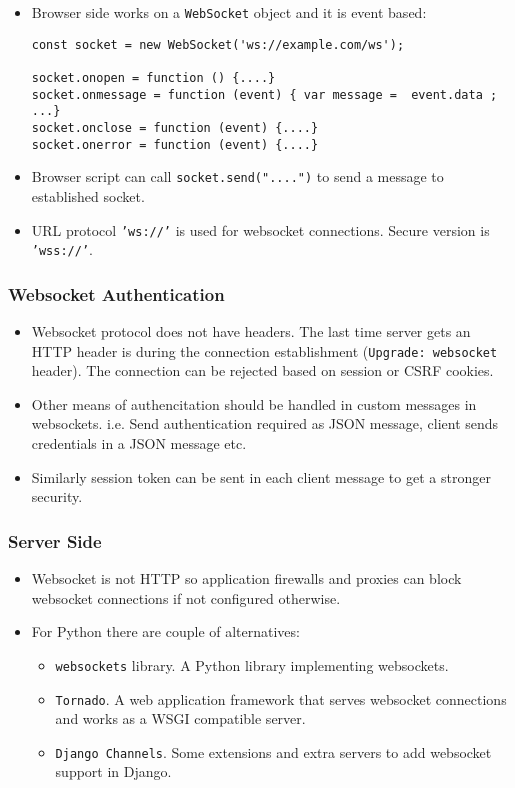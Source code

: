 \documentclass[trans,compress,xcolor=table]{beamer}
\begin{document}
\begin{frame}[fragile]
\begin{itemize}
\item Browser side works on a \lstinline!WebSocket! object and it is event based:
\begin{lstlisting}
const socket = new WebSocket('ws://example.com/ws');

socket.onopen = function () {....}
socket.onmessage = function (event) { var message =  event.data ; ...}
socket.onclose = function (event) {....}
socket.onerror = function (event) {....}
\end{lstlisting}
\item Browser script can call \lstinline!socket.send("....")! to send a message to established
	socket.
\item URL protocol \texttt{'ws://'} is used for websocket connections. Secure version is
	 \texttt{'wss://'}.
\end{itemize}
\end{frame}

\begin{frame}[fragile]
\frametitle{Websocket Authentication}
\begin{itemize}
\item Websocket protocol does not have headers. The last time server gets an HTTP header is
	during the connection establishment (\texttt{Upgrade: websocket} header). The connection
	can be rejected based on session or CSRF cookies.
\item Other means of authencitation should be handled in custom messages in websockets.
	i.e. Send authentication required as JSON message, client sends credentials in a JSON message etc.
\item Similarly session token can be sent in each client message to get a stronger security.
\end{itemize}
\end{frame}

\begin{frame}[fragile]
\frametitle{Server Side}
\begin{itemize}
\item Websocket is not HTTP so application firewalls and proxies can block websocket connections if not configured otherwise.
\item For Python there are couple of alternatives:
\begin{itemize}
	\item \texttt{websockets} library. A Python library implementing websockets.
	\item \texttt{Tornado}. A web application framework that serves websocket connections and works as a WSGI compatible server.
	\item \texttt{Django Channels}. Some extensions and extra servers to add websocket support in Django.
\end{itemize}
\end{itemize}
\end{frame}
\end{document}
